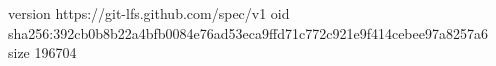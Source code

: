 version https://git-lfs.github.com/spec/v1
oid sha256:392cb0b8b22a4bfb0084e76ad53eca9ffd71c772c921e9f414cebee97a8257a6
size 196704
